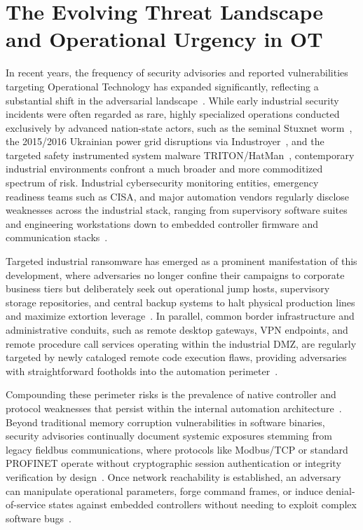 \documentclass[target=mst,aauheader=aics,style=]{thud}
\begin{document}
\section{The Evolving Threat Landscape and Operational Urgency in OT}
\label{sec:ot_urgency}
In recent years, the frequency of security advisories and reported vulnerabilities targeting Operational Technology has expanded significantly, reflecting a substantial shift in the adversarial landscape~\cite{MITRE_ICS_2024}. While early industrial security incidents were often regarded as rare, highly specialized operations conducted exclusively by advanced nation-state actors, such as the seminal Stuxnet worm~\cite{langner2011stuxnet}, the 2015/2016 Ukrainian power grid disruptions via Industroyer~\cite{case2016ukraine}, and the targeted safety instrumented system malware TRITON/HatMan~\cite{johnson2017triton}, contemporary industrial environments confront a much broader and more commoditized spectrum of risk. Industrial cybersecurity monitoring entities, emergency readiness teams such as CISA, and major automation vendors regularly disclose weaknesses across the industrial stack, ranging from supervisory software suites and engineering workstations down to embedded controller firmware and communication stacks~\cite{mitre_ics}. 

Targeted industrial ransomware has emerged as a prominent manifestation of this development, where adversaries no longer confine their campaigns to corporate business tiers but deliberately seek out operational jump hosts, supervisory storage repositories, and central backup systems to halt physical production lines and maximize extortion leverage~\cite{SunderOT}. In parallel, common border infrastructure and administrative conduits, such as remote desktop gateways, VPN endpoints, and remote procedure call services operating within the industrial DMZ, are regularly targeted by newly cataloged remote code execution flaws, providing adversaries with straightforward footholds into the automation perimeter~\cite{Ou05, TayouriSurvey}. 

Compounding these perimeter risks is the prevalence of native controller and protocol weaknesses that persist within the internal automation architecture~\cite{StanExtended}. Beyond traditional memory corruption vulnerabilities in software binaries, security advisories continually document systemic exposures stemming from legacy fieldbus communications, where protocols like Modbus/TCP or standard PROFINET operate without cryptographic session authentication or integrity verification by design~\cite{StanExtended, SunderOT}. Once network reachability is established, an adversary can manipulate operational parameters, forge command frames, or induce denial-of-service states against embedded controllers without needing to exploit complex software bugs~\cite{StanExtended}.
\end{document}
